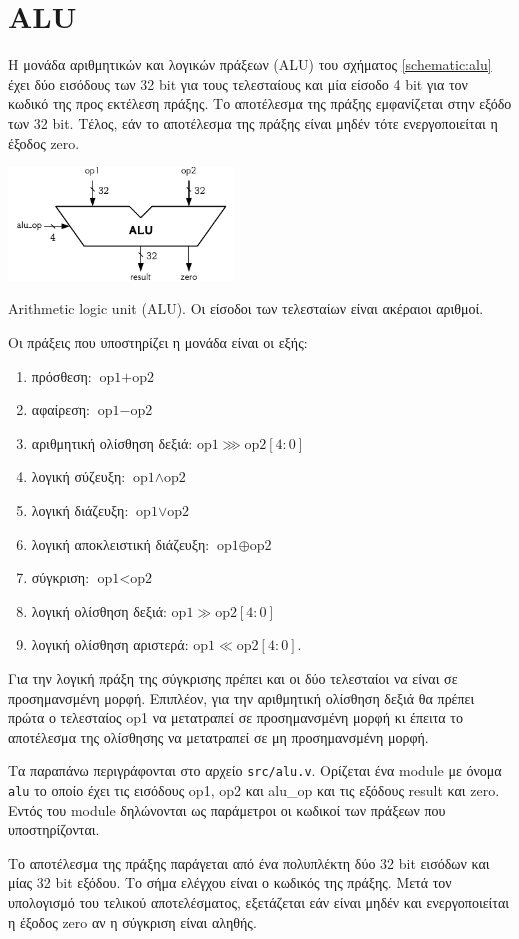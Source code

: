 \section{ALU}

Η μονάδα αριθμητικών και λογικών πράξεων (ALU) του σχήματος \ref{schematic:alu} έχει δύο εισόδους των 32 bit για τους τελεσταίους και μία είσοδο 4 bit για τον κωδικό της προς εκτέλεση πράξης. Το αποτέλεσμα της πράξης εμφανίζεται στην εξόδο των 32 bit. Τέλος, εάν το αποτέλεσμα της πράξης είναι μηδέν τότε ενεργοποιείται η έξοδος zero.\par

\begin{circuitfig}[H]
	\centering
	\includegraphics[width=6cm]{schematics/alu.pdf}
	\caption{Arithmetic logic unit (ALU). Οι είσοδοι των τελεσταίων είναι ακέραιοι αριθμοί.}
	\label{schematic:alu}
\end{circuitfig}

Οι πράξεις που υποστηρίζει η μονάδα είναι οι εξής:
\begin{enumerate}[itemsep=-0.5ex]
	\item πρόσθεση: $\text{op1}+\text{op2}$
	\item αφαίρεση: $\text{op1}-\text{op2}$
	\item αριθμητική ολίσθηση δεξιά: $\text{op1}\ggg\text{op2}[4:0]$
	\item λογική σύζευξη: $\text{op1}\land\text{op2}$
	\item λογική διάζευξη: $\text{op1}\lor\text{op2}$
	\item λογική αποκλειστική διάζευξη: $\text{op1}\oplus\text{op2}$
	\item σύγκριση: $\text{op1}<\text{op2}$
	\item λογική ολίσθηση δεξιά: $\text{op1}\gg\text{op2}[4:0]$
	\item λογική ολίσθηση αριστερά: $\text{op1}\ll\text{op2}[4:0]$.
\end{enumerate}

Για την λογική πράξη της σύγκρισης πρέπει και οι δύο τελεσταίοι να είναι σε προσημανσμένη μορφή. Επιπλέον, για την αριθμητική ολίσθηση δεξιά θα πρέπει πρώτα ο τελεσταίος op1 να μετατραπεί σε προσημανσμένη μορφή κι έπειτα το αποτέλεσμα της ολίσθησης να μετατραπεί σε μη προσημανσμένη μορφή.

Τα παραπάνω περιγράφονται στο αρχείο \texttt{src/alu.v}. Ορίζεται ένα module με όνομα \texttt{alu} το οποίο έχει τις εισόδους op1, op2 και alu\_op και τις εξόδους result και zero. Εντός του module δηλώνονται ως παράμετροι οι κωδικοί των πράξεων που υποστηρίζονται.\par
Το αποτέλεσμα της πράξης παράγεται από ένα πολυπλέκτη δύο 32 bit εισόδων και μίας 32 bit εξόδου. Το σήμα ελέγχου είναι ο κωδικός της πράξης. Μετά τον υπολογισμό του τελικού αποτελέσματος, εξετάζεται εάν είναι μηδέν και ενεργοποιείται η έξοδος zero αν η σύγκριση είναι αληθής.\par